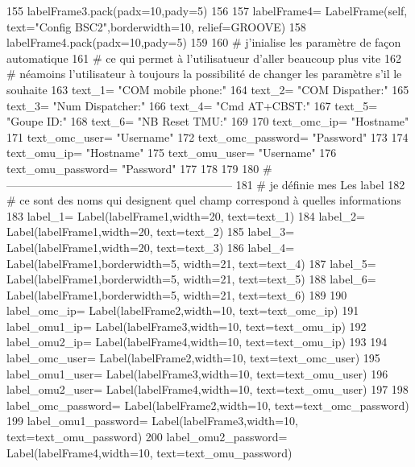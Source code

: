 \begin{DoxyCode}
155     labelFrame3.pack(padx=10,pady=5)
156 
157     labelFrame4= LabelFrame(self, text=\textcolor{stringliteral}{"Config BSC2"},borderwidth=10, relief=GROOVE)
158     labelFrame4.pack(padx=10,pady=5)
159 
160     \textcolor{comment}{# j'inialise les paramètre de façon automatique
}
161     \textcolor{comment}{# ce qui permet à l'utilisatueur d'aller beaucoup plus vite
}
162     \textcolor{comment}{# néamoins l'utilisateur à toujours la possibilité de changer les paramètre s'il le souhaite 
}
163     text\_1= \textcolor{stringliteral}{"COM mobile phone:"}
164     text\_2= \textcolor{stringliteral}{"COM Dispather:"}
165     text\_3= \textcolor{stringliteral}{"Num Dispatcher:"}
166     text\_4= \textcolor{stringliteral}{"Cmd AT+CBST:"}
167     text\_5= \textcolor{stringliteral}{"Goupe ID:"}
168     text\_6= \textcolor{stringliteral}{"NB Reset TMU:"}
169 
170     text\_omc\_ip= \textcolor{stringliteral}{"Hostname"}
171     text\_omc\_user= \textcolor{stringliteral}{"Username"}
172     text\_omc\_password= \textcolor{stringliteral}{"Password"}
173 
174     text\_omu\_ip= \textcolor{stringliteral}{"Hostname"}
175     text\_omu\_user= \textcolor{stringliteral}{"Username"}
176     text\_omu\_password= \textcolor{stringliteral}{"Password"}
177 
178 
179 
180 \textcolor{comment}{#------------------------------------------------------------
}
181     \textcolor{comment}{# je définie mes Les label 
}
182     \textcolor{comment}{# ce sont des noms qui designent quel champ correspond à quelles informations
}
183     label\_1= Label(labelFrame1,width=20, text=text\_1)
184     label\_2= Label(labelFrame1,width=20, text=text\_2)
185     label\_3= Label(labelFrame1,width=20, text=text\_3)
186     label\_4= Label(labelFrame1,borderwidth=5, width=21, text=text\_4)
187     label\_5= Label(labelFrame1,borderwidth=5, width=21, text=text\_5)
188     label\_6= Label(labelFrame1,borderwidth=5, width=21, text=text\_6)
189 
190     label\_omc\_ip= Label(labelFrame2,width=10, text=text\_omc\_ip)
191     label\_omu1\_ip= Label(labelFrame3,width=10, text=text\_omu\_ip)
192     label\_omu2\_ip= Label(labelFrame4,width=10, text=text\_omu\_ip)
193 
194     label\_omc\_user= Label(labelFrame2,width=10, text=text\_omc\_user)
195     label\_omu1\_user= Label(labelFrame3,width=10, text=text\_omu\_user)
196     label\_omu2\_user= Label(labelFrame4,width=10, text=text\_omu\_user)
197 
198     label\_omc\_password= Label(labelFrame2,width=10, text=text\_omc\_password)
199     label\_omu1\_password= Label(labelFrame3,width=10, text=text\_omu\_password)
200     label\_omu2\_password= Label(labelFrame4,width=10, text=text\_omu\_password)

\end{DoxyCode}

